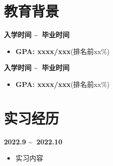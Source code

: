 \documentclass[UTF8,AutoFakeBold]{resume}
\begin{document}
\section{\hspace{0.25em}\makebox[0.75em][c]{\faGraduationCap} \fangsong\textbf{教育背景}}
{\textbf{入学时间 \textasciitilde \ 毕业时间}}
\begin{itemize}
    \item \kaishu\textbf{GPA: xxxx/xxx}\quad(排名前xx\%)
\end{itemize}
{\textbf{入学时间 \textasciitilde \ 毕业时间}}
\begin{itemize}
	\item \kaishu\textbf{GPA: xxxx/xxx}\quad(排名前xx\%)
\end{itemize}
\section{\hspace{0.25em}\makebox[0.75em][c]{\faUsers} \fangsong\textbf{实习经历}}
{\large\textbf{2022.9 \textasciitilde \ 2022.10}}
    \begin{itemize}
      \item \kaishu 实习内容
    \end{itemize}
\end{document}
